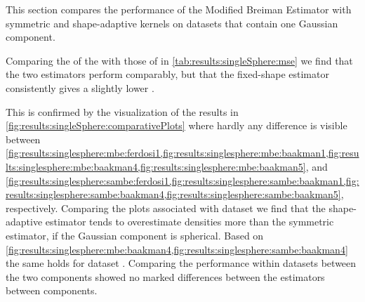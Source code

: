 
This section compares the performance of the Modified Breiman Estimator with symmetric and shape-adaptive kernels on datasets that contain one Gaussian component. 
	\begin{table}
		\centering
		
		\caption{Performance of the Modified Breiman Estimator with fixed-shaped and shape-adaptive kernels on the datasets with a single Gaussian component.} 	
		\label{tab:results:singleSphere:mse}
	\end{table}
	Comparing the \mses of the \mbe with those of \sambe in \cref{tab:results:singleSphere:mse} we find that the two estimators perform comparably, but that the fixed-shape estimator consistently gives a slightly lower \mse. 

	\begin{figure*}
		\centering
		
		\caption{The density as estimated by \mbe and \sambe as a function of the known density of datasets \ferdosiOne through \baakmanFive.}
		\label{fig:results:singleSphere:comparativePlots}
	\end{figure*}
	This is confirmed by the visualization of the results in \cref{fig:results:singleSphere:comparativePlots} where hardly any difference is visible between \cref{fig:results:singlesphere:mbe:ferdosi1,fig:results:singlesphere:mbe:baakman1,fig:results:singlesphere:mbe:baakman4,fig:results:singlesphere:mbe:baakman5}, and \cref{fig:results:singlesphere:sambe:ferdosi1,fig:results:singlesphere:sambe:baakman1,fig:results:singlesphere:sambe:baakman4,fig:results:singlesphere:sambe:baakman5}, respectively. 
		Comparing the plots associated with dataset \ferdosiOne we find that the shape-adaptive estimator tends to overestimate densities more than the symmetric estimator, if the Gaussian component is spherical.
		Based on \cref{fig:results:singlesphere:mbe:baakman4,fig:results:singlesphere:sambe:baakman4} the same holds for dataset \baakmanFour. 
	Comparing the performance within datasets between the two components showed no marked differences between the estimators between components.

